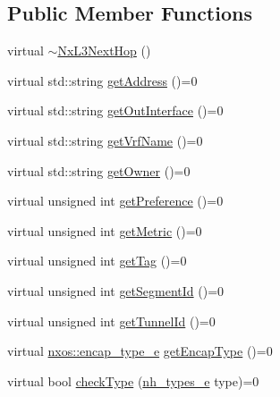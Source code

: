 \subsection*{Public Member Functions}
\begin{DoxyCompactItemize}
\item 
virtual \mbox{\hyperlink{classnxos_1_1_nx_l3_next_hop_a98362517a1a558bc9ecf457452273afb}{$\sim$\+Nx\+L3\+Next\+Hop}} ()
\item 
virtual std\+::string \mbox{\hyperlink{classnxos_1_1_nx_l3_next_hop_a3a14a096cdf818a156c1be62623e644c}{get\+Address}} ()=0
\item 
virtual std\+::string \mbox{\hyperlink{classnxos_1_1_nx_l3_next_hop_a768953432b23d2d35cb6d5ff1b47cfa2}{get\+Out\+Interface}} ()=0
\item 
virtual std\+::string \mbox{\hyperlink{classnxos_1_1_nx_l3_next_hop_ab4488d93cc0df12157430dd86f5f4242}{get\+Vrf\+Name}} ()=0
\item 
virtual std\+::string \mbox{\hyperlink{classnxos_1_1_nx_l3_next_hop_a03ae40373ad9be88b6a18e7119aff080}{get\+Owner}} ()=0
\item 
virtual unsigned int \mbox{\hyperlink{classnxos_1_1_nx_l3_next_hop_a88cebcbe727acec85e772c34b9138b18}{get\+Preference}} ()=0
\item 
virtual unsigned int \mbox{\hyperlink{classnxos_1_1_nx_l3_next_hop_a3d72a5a7b99b292b11248b25daef63c0}{get\+Metric}} ()=0
\item 
virtual unsigned int \mbox{\hyperlink{classnxos_1_1_nx_l3_next_hop_ab1f31be8dc748644f6ee2e4d6cbfda6c}{get\+Tag}} ()=0
\item 
virtual unsigned int \mbox{\hyperlink{classnxos_1_1_nx_l3_next_hop_a21b283ed84a9519fab6fef635e6f21d9}{get\+Segment\+Id}} ()=0
\item 
virtual unsigned int \mbox{\hyperlink{classnxos_1_1_nx_l3_next_hop_aaaf9a3c718cf01e57c36d95a4fd19980}{get\+Tunnel\+Id}} ()=0
\item 
virtual \mbox{\hyperlink{namespacenxos_a2a822a577ca51dbe26b8637c22eb4ca0}{nxos\+::encap\+\_\+type\+\_\+e}} \mbox{\hyperlink{classnxos_1_1_nx_l3_next_hop_ab873695bc97ea1085013056e4989a297}{get\+Encap\+Type}} ()=0
\item 
virtual bool \mbox{\hyperlink{classnxos_1_1_nx_l3_next_hop_a8a061c4cbcd814b197ea778514a20cb8}{check\+Type}} (\mbox{\hyperlink{classnxos_1_1_nx_l3_next_hop_ab58475e35a53b76cb9bdbfde04d537f3}{nh\+\_\+types\+\_\+e}} type)=0
\end{DoxyCompactItemize}


